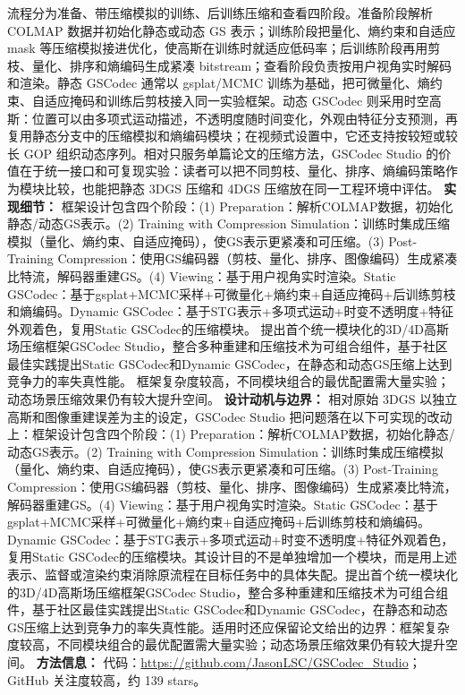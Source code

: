 流程分为准备、带压缩模拟的训练、后训练压缩和查看四阶段。准备阶段解析 COLMAP 数据并初始化静态或动态 GS 表示；训练阶段把量化、熵约束和自适应 mask 等压缩模拟接进优化，使高斯在训练时就适应低码率；后训练阶段再用剪枝、量化、排序和熵编码生成紧凑 bitstream；查看阶段负责按用户视角实时解码和渲染。静态 GSCodec 通常以 gsplat/MCMC 训练为基础，把可微量化、熵约束、自适应掩码和训练后剪枝接入同一实验框架。动态 GSCodec 则采用时空高斯：位置可以由多项式运动描述，不透明度随时间变化，外观由特征分支预测，再复用静态分支中的压缩模拟和熵编码模块；在视频式设置中，它还支持按较短或较长 GOP 组织动态序列。相对只服务单篇论文的压缩方法，GSCodec Studio 的价值在于统一接口和可复现实验：读者可以把不同剪枝、量化、排序、熵编码策略作为模块比较，也能把静态 3DGS 压缩和 4DGS 压缩放在同一工程环境中评估。
\textbf{实现细节：} 框架设计包含四个阶段：(1) Preparation：解析COLMAP数据，初始化静态/动态GS表示。(2) Training with Compression Simulation：训练时集成压缩模拟（量化、熵约束、自适应掩码），使GS表示更紧凑和可压缩。(3) Post-Training Compression：使用GS编码器（剪枝、量化、排序、图像编码）生成紧凑比特流，解码器重建GS。(4) Viewing：基于用户视角实时渲染。Static GSCodec：基于gsplat+MCMC采样+可微量化+熵约束+自适应掩码+后训练剪枝和熵编码。Dynamic GSCodec：基于STG表示+多项式运动+时变不透明度+特征外观着色，复用Static GSCodec的压缩模块。 提出首个统一模块化的3D/4D高斯场压缩框架GSCodec Studio，整合多种重建和压缩技术为可组合组件，基于社区最佳实践提出Static GSCodec和Dynamic GSCodec，在静态和动态GS压缩上达到竞争力的率失真性能。 框架复杂度较高，不同模块组合的最优配置需大量实验；动态场景压缩效果仍有较大提升空间。
\textbf{设计动机与边界：} 相对原始 3DGS 以独立高斯和图像重建误差为主的设定，GSCodec Studio 把问题落在以下可实现的改动上：框架设计包含四个阶段：(1) Preparation：解析COLMAP数据，初始化静态/动态GS表示。(2) Training with Compression Simulation：训练时集成压缩模拟（量化、熵约束、自适应掩码），使GS表示更紧凑和可压缩。(3) Post-Training Compression：使用GS编码器（剪枝、量化、排序、图像编码）生成紧凑比特流，解码器重建GS。(4) Viewing：基于用户视角实时渲染。Static GSCodec：基于gsplat+MCMC采样+可微量化+熵约束+自适应掩码+后训练剪枝和熵编码。Dynamic GSCodec：基于STG表示+多项式运动+时变不透明度+特征外观着色，复用Static GSCodec的压缩模块。其设计目的不是单独增加一个模块，而是用上述表示、监督或渲染约束消除原流程在目标任务中的具体失配。提出首个统一模块化的3D/4D高斯场压缩框架GSCodec Studio，整合多种重建和压缩技术为可组合组件，基于社区最佳实践提出Static GSCodec和Dynamic GSCodec，在静态和动态GS压缩上达到竞争力的率失真性能。适用时还应保留论文给出的边界：框架复杂度较高，不同模块组合的最优配置需大量实验；动态场景压缩效果仍有较大提升空间。
\textbf{方法信息：} 代码：\url{https://github.com/JasonLSC/GSCodec_Studio}；GitHub 关注度较高，约 139 stars。



